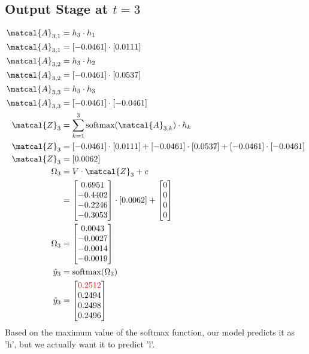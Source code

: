 \documentclass{article}
\begin{document}
\subsection*{Output Stage at $t=3$}
\begin{align*}
\matcal{A}_{3,1} &= h_3 \cdot h_1 \\
\matcal{A}_{3,1} &= [-0.0461] \cdot [0.0111] \\
\matcal{A}_{3,2} &= h_3 \cdot h_2 \\
\matcal{A}_{3,2} &= [-0.0461] \cdot [0.0537] \\
\matcal{A}_{3,3} &= h_3 \cdot h_3 \\
\matcal{A}_{3,3} &= [-0.0461] \cdot [-0.0461] \\
\matcal{Z}_3 &= \sum_{k=1}^3 \text{softmax}(\matcal{A}_{3,k}) \cdot h_k \\
\matcal{Z}_3 &= [-0.0461] \cdot [0.0111] + [-0.0461] \cdot [0.0537]+ [-0.0461] \cdot [-0.0461]\\
\matcal{Z}_3 &= [0.0062] \\
\Omega_3 &= V \cdot \matcal{Z}_3 + c \\
 &= \begin{bmatrix}
  0.6951 \\
 -0.4402 \\
 -0.2246 \\
 -0.3053
\end{bmatrix} \cdot [0.0062] + \begin{bmatrix} 0 \\ 0 \\ 0 \\ 0\end{bmatrix}\\
\Omega_3 &= \begin{bmatrix}
 0.0043 \\
-0.0027 \\
-0.0014 \\
-0.0019
\end{bmatrix} \\
\hat{y}_3 &= \text{softmax}(\Omega_3) \\
\hat{y}_3 &= \begin{bmatrix}
\textcolor{red}{0.2512} \\
0.2494 \\
0.2498 \\
0.2496
\end{bmatrix} \\
\end{align*}
Based on the maximum value of the softmax function, our model predicts it as 'h', but we actually want it to predict 'l'.
\end{document}
